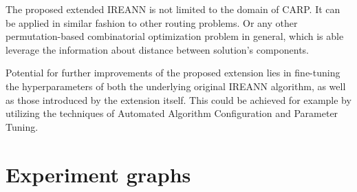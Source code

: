 \documentclass[twoside]{ctuthesis}
\theoremstyle{plain}
\theoremstyle{definition}
\theoremstyle{note}
\begin{document}
The proposed extended IREANN is not limited to the domain of CARP. It can be applied in similar fashion to other routing problems. Or any other permutation-based combinatorial optimization problem in general, which is able leverage the information about distance between solution's components.

Potential for further improvements of the proposed extension lies in fine-tuning the hyperparameters of both the underlying original IREANN algorithm, as well as those introduced by the extension itself. This could be achieved for example by utilizing the techniques of Automated Algorithm Configuration and Parameter Tuning.








\appendix
\chapter{Experiment graphs}
\label{sec:appendix}

%
%	
\end{document}
